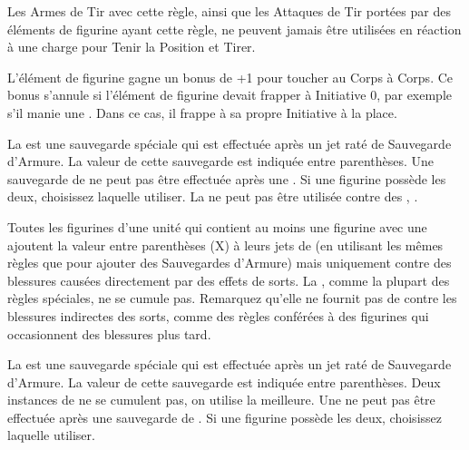 
Les Armes de Tir avec cette règle, ainsi que les Attaques de Tir portées par des éléments de figurine ayant cette règle, ne peuvent jamais être utilisées en réaction à une charge pour Tenir la Position et Tirer.


L'élément de figurine gagne un bonus de +1 pour toucher au Corps à Corps. Ce bonus s'annule si l'élément de figurine devait frapper à Initiative 0, par exemple s'il manie une \gw{}. Dans ce cas, il frappe à sa propre Initiative à la place.

\newpage
{}

La \regeneration{} est une sauvegarde spéciale qui est effectuée après un jet raté de Sauvegarde d'Armure. La valeur de cette sauvegarde est indiquée entre parenthèses. Une sauvegarde de \regeneration{} ne peut pas être effectuée après une \wardsave{}. Si une figurine possède les deux, choisissez laquelle utiliser. La \regeneration{} ne peut pas être utilisée contre des \flamingattacks{}, .

\label{magicresistance}

Toutes les figurines d'une unité qui contient au moins une figurine avec une \magicresistance{} ajoutent la valeur entre parenthèses (X) à leurs jets de \wardsave{} (en utilisant les mêmes règles que pour ajouter des Sauvegardes d'Armure) mais uniquement contre des blessures causées directement par des effets de sorts. La \magicresistance{}, comme la plupart des règles spéciales, ne se cumule pas. Remarquez qu'elle ne fournit pas de \wardsave{} contre les blessures indirectes des sorts, comme des règles conférées à des figurines qui occasionnent des blessures plus tard.


La \wardsave{} est une sauvegarde spéciale qui est effectuée après un jet raté de Sauvegarde d'Armure. La valeur de cette sauvegarde est indiquée entre parenthèses. Deux instances de \wardsave{} ne se cumulent pas, on utilise la meilleure. Une \wardsave{} ne peut pas être effectuée après une sauvegarde de \regeneration{}. Si une figurine possède les deux, choisissez laquelle utiliser.

